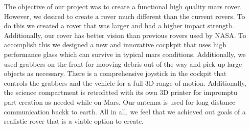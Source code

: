 The objective of our project was to create a functional high quality mars rover.  However, we desired to create a rover much different than the current rovers.  To do this we created a rover that was larger and had a higher impact strength.  Additionally, our rover has better vision than previous rovers used by NASA.  To accomplish this we designed a new and innovative cocpkpit that uses high performance glass which can survive in typical mars conditions.  Additionally, we used grabbers on the front for mooving debris out of the way and pick up large objects as necessary.  There is a comprehensive joystick in the cockpit that controls the grabbers and the vehicle for a full 3D range of motion.  Additionally, the science compartment is retrofitted with its own 3D printer for impromptu part creation as needed while on Mars.  Our antenna is used for long distance communication backk to earth.  All in all, we feel that we achieved out goals of a realistic rover that is a viable option to create.
